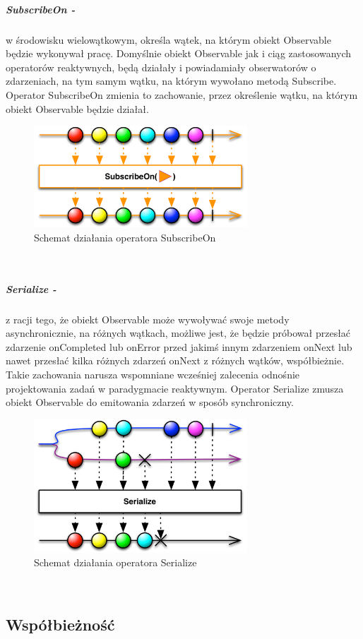 \documentclass[12pt,oneside,a4paper]{report}
\begin{document}
\subparagraph{SubscribeOn -}w środowisku wielowątkowym, określa wątek, na którym obiekt Observable będzie wykonywał pracę. Domyślnie obiekt Observable jak i ciąg zastosowanych operatorów reaktywnych, będą działały i powiadamiały obserwatorów o zdarzeniach, na tym samym wątku, na którym wywołano metodą Subscribe. Operator SubscribeOn zmienia to zachowanie, przez określenie wątku, na którym obiekt Observable będzie działał. 
\begin{figure}[ht!]
	\centering
	\includegraphics[width=8cm]{subscribeOn}
	\caption{Schemat działania operatora SubscribeOn}
	\label{subscribeOn}
\end{figure}\\
\subparagraph{Serialize -}z racji tego, że obiekt Observable może wywoływać swoje metody asynchronicznie, na różnych wątkach, możliwe jest, że będzie próbował przesłać zdarzenie onCompleted lub onError przed jakimś innym zdarzeniem onNext lub nawet przesłać kilka różnych zdarzeń onNext z różnych wątków, współbieżnie. Takie zachowania narusza wspomniane wcześniej zalecenia odnośnie projektowania zadań w paradygmacie reaktywnym. Operator Serialize zmusza obiekt Observable do emitowania zdarzeń w sposób synchroniczny.
\begin{figure}[ht!]
	\centering
	\includegraphics[width=8cm]{serialize}
	\caption{Schemat działania operatora Serialize}
	\label{serialize}
\end{figure}\\
\subsection{Współbieżność}
\end{document}
